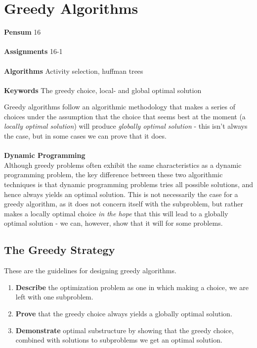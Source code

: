 
\chapter{Greedy Algorithms}
\label{ch:greedyalgorithms}

\textbf{Pensum} 16 \cite{clrs} \\\\
\textbf{Assignments} 16-1 \\\\
\textbf{Algorithms} Activity selection, huffman trees \\\\
\textbf{Keywords} The greedy choice, local- and global optimal solution
\vspace{1in}

\noindent Greedy algorithms follow an algorithmic methodology that makes a
series of choices under the assumption that the choice that seems best at the
moment (a \textit{locally optimal solution}) will produce \textit{globally
optimal solution} - this isn't always the case, but in some cases we can prove
that it does.
\\\\
\noindent \textbf{Dynamic Programming} \\
Although greedy problems often exhibit the same characteristics as a dynamic
programming problem, the key difference between these two algorithmic
techniques is that dynamic programming problems tries all possible solutions,
and hence always yields an optimal solution. This is not necessarily the case
for a greedy algorithm, as it does not concern itself with the subproblem, but
rather makes a locally optimal choice \textit{in the hope} that this will lead
to a globally optimal solution - we can, however, show that it will for some
problems.

\newpage
\section{The Greedy Strategy}
These are the guidelines for designing greedy algorithms.
\begin{enumerate}
	\item \textbf{Describe} the optimization problem as one in which making a
choice, we are left with one subproblem.
	\item \textbf{Prove} that the greedy choice always yields a globally
optimal solution.
	\item \textbf{Demonstrate} optimal substructure by showing that the greedy
choice, combined with solutions to subproblems we get an optimal solution.
\end{enumerate}

